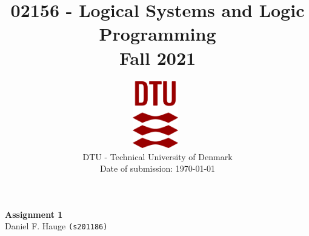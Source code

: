 \documentclass[a4paper]{article}
\begin{document}
\title{02156 - Logical Systems and Logic Programming\\Fall 2021}
\author{
\includegraphics[width=0.15\textwidth]{images/dtu.eps}~\\[1cm]
    DTU - Technical University of Denmark
    \\[0.5cm]
    Date of submission: \today
    \\
}
\date{} %
\color{black}
\maketitle
\begin{center}
{ \huge \bfseries Assignment 1}\\

\vspace{.25cm}
Daniel F. Hauge \texttt{(s201186)}\\


\vspace{.25cm}
\end{center}


\medskip
\newpage


\end{document}
